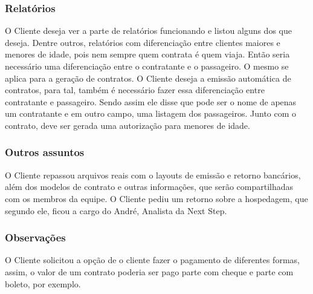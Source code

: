 \documentclass[a4paper, 12pt]{article}
\begin{document}
\subsubsection*{Relatórios}
O Cliente deseja ver a parte de relatórios funcionando e listou alguns dos que deseja. Dentre outros, relatórios com diferenciação entre clientes maiores e menores de idade, pois nem sempre quem contrata é quem viaja. Então seria necessário uma diferenciação entre o contratante e o passageiro.
O mesmo se aplica para a geração de contratos. O Cliente deseja a emissão automática de contratos, para tal, também é necessário fazer essa diferenciação entre contratante e passageiro. Sendo assim ele disse que pode ser o nome de apenas um contratante e em outro campo, uma listagem dos passageiros. Junto com o contrato, deve ser gerada uma autorização para menores de idade.

\subsubsection*{Outros assuntos}
O Cliente repassou arquivos reais com o layouts de emissão e retorno bancários, além dos modelos de contrato e outras informações, que serão compartilhadas com os membros da equipe.
O Cliente pediu um retorno sobre a hospedagem, que segundo ele, ficou a cargo do André, Analista da Next Step.

\subsubsection*{Observações}
O Cliente solicitou a opção de o cliente fazer o pagamento de diferentes formas, assim, o valor de um contrato poderia ser pago parte com cheque e parte com boleto, por exemplo.

\clearpage
\end{document}

